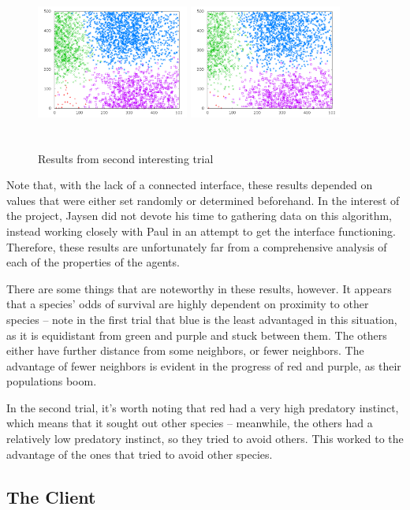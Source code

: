 \begin{figure}
    \includegraphics[width=5cm,height=5cm]{Trial2-20000.png}
    \includegraphics[width=5cm,height=5cm]{Trial2-25000.png}
    \caption{Results from second interesting trial}
\end{figure}

Note that, with the lack of a connected interface, these results depended on values
that were either set randomly or determined beforehand. In the interest of the
project, Jaysen did not devote his time to gathering data on this algorithm,
instead working closely with Paul in an attempt to get the interface functioning.\\
Therefore, these results are unfortunately far from a comprehensive analysis of
each of the properties of the agents.

There are some things that are noteworthy in these results, however. It appears
that a species' odds of survival are highly dependent on proximity to other species
-- note in the first trial that blue is the least advantaged in this situation, as
it is equidistant from green and purple and stuck between them. The others either
have further distance from some neighbors, or fewer neighbors. The advantage of
fewer neighbors is evident in the progress of red and purple, as their populations
boom.

In the second trial, it's worth noting that red had a very high predatory instinct,
which means that it sought out other species -- meanwhile, the others had a
relatively low predatory instinct, so they tried to avoid others. This worked to
the advantage of the ones that tried to avoid other species.

\subsection{The Client}
